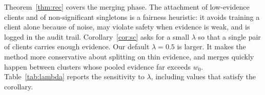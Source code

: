 \begin{remark}
Theorem~\ref{thm:rec} covers the merging phase. The attachment of low-evidence clients and of non-significant singletons is a fairness heuristic: it avoids training a client alone because of noise, may violate safety when evidence is weak, and is logged in the audit trail. Corollary~\ref{cor:sc} asks for a small $\lambda$ so that a single pair of clients carries enough evidence. Our default $\lambda=0.5$ is larger. It makes the method more conservative about splitting on thin evidence, and merges quickly happen between clusters whose pooled evidence far exceeds $w_0$. Table~\ref{tab:lambda} reports the sensitivity to $\lambda$, including values that satisfy the corollary.
\end{remark}


